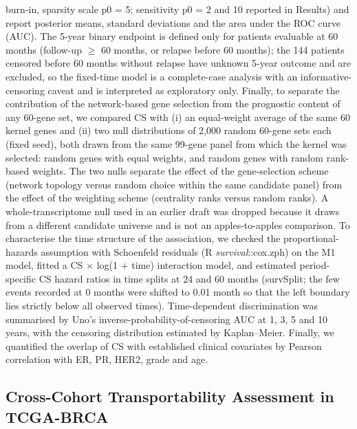 \documentclass[12pt]{article}
\begin{document}
burn-in, sparsity scale p0 = 5; sensitivity p0 = 2 and 10 reported in
Results) and report posterior means, standard deviations and the area under
the ROC curve (AUC). The 5-year binary endpoint is defined only for patients
evaluable at 60 months (follow-up $\geq$ 60 months, or relapse before 60
months); the 144 patients censored before 60 months without relapse have
unknown 5-year outcome and are excluded, so the fixed-time model is a
complete-case analysis with an informative-censoring caveat and is
interpreted as exploratory only. Finally,
to separate the contribution of the network-based gene selection from the
prognostic content of any 60-gene set, we compared CS with (i) an
equal-weight average of the same 60 kernel genes and (ii) two null
distributions of 2,000 random 60-gene sets each (fixed seed), both drawn
from the same 99-gene panel from which the kernel was selected: random
genes with equal weights, and random genes with random rank-based weights.
The two nulls separate the effect of the gene-selection scheme (network
topology versus random choice within the same candidate panel) from the
effect of the weighting scheme (centrality ranks versus random ranks). A
whole-transcriptome null used in an earlier draft was dropped because it
draws from a different candidate universe and is not an apples-to-apples
comparison. To
characterise the time structure of the association, we checked the
proportional-hazards assumption with Schoenfeld residuals (R
\emph{survival}::cox.zph) on the M1 model, fitted a CS $\times$ log(1 $+$
time) interaction model, and estimated period-specific CS hazard ratios in
time splits at 24 and 60 months (survSplit; the few events recorded at 0
months were shifted to 0.01 month so that the left boundary lies strictly
below all observed times). Time-dependent discrimination was summarised by
Uno's inverse-probability-of-censoring AUC at 1, 3, 5 and 10 years, with
the censoring distribution estimated by Kaplan--Meier. Finally, we
quantified the overlap of CS with established clinical covariates by Pearson
correlation with ER, PR, HER2, grade and age.

\subsection{Cross-Cohort Transportability Assessment in TCGA-BRCA}
\end{document}
